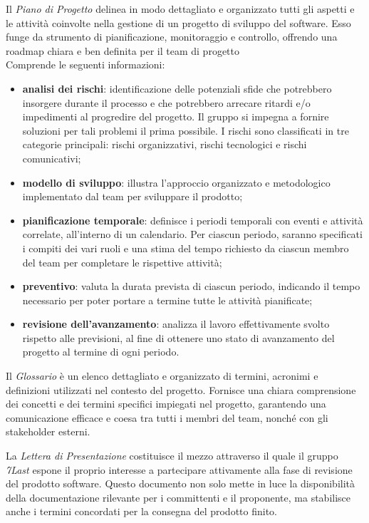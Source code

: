 Il \textit{Piano di Progetto} delinea in modo dettagliato e organizzato tutti gli aspetti e le attività coinvolte nella gestione di un progetto di sviluppo del software. Esso funge da strumento di pianificazione, monitoraggio e controllo, offrendo una roadmap chiara e ben definita per il team di progetto\\
Comprende le seguenti informazioni:
\begin{itemize}
	\item \textbf{analisi dei rischi}: identificazione delle potenziali sfide che potrebbero insorgere durante il processo e che potrebbero arrecare ritardi e/o impedimenti al progredire del progetto. Il gruppo si impegna a fornire soluzioni per tali problemi il prima possibile. I rischi sono classificati in tre categorie principali: rischi organizzativi, rischi tecnologici e rischi comunicativi;
	\item \textbf{modello di sviluppo}: illustra l'approccio organizzato e metodologico implementato dal team per sviluppare il prodotto;
	\item \textbf{pianificazione temporale}: definisce i periodi temporali con eventi e attività correlate, all'interno di un calendario. Per ciascun periodo, saranno specificati i compiti dei vari ruoli e una stima del tempo richiesto da ciascun membro del team per completare le rispettive attività;
	\item \textbf{preventivo}: valuta la durata prevista di ciascun periodo, indicando il tempo necessario per poter portare a termine tutte le attività pianificate;
	\item \textbf{revisione dell'avanzamento}: analizza il lavoro effettivamente svolto rispetto alle previsioni, al fine di ottenere uno stato di avanzamento del progetto al termine di ogni periodo.
\end{itemize}

Il \textit{Glossario} è un elenco dettagliato e organizzato di termini, acronimi e definizioni utilizzati nel contesto del progetto. Fornisce una chiara comprensione dei concetti e dei termini specifici impiegati nel progetto, garantendo una comunicazione efficace e coesa tra tutti i membri del team, nonché con gli stakeholder esterni.

La \textit{Lettera di Presentazione} costituisce il mezzo attraverso il quale il gruppo \textit{7Last} espone il proprio interesse a partecipare attivamente alla fase di revisione del prodotto software. Questo documento non solo mette in luce la disponibilità della documentazione rilevante per i committenti e il proponente, ma stabilisce anche i termini concordati per la consegna del prodotto finito.

